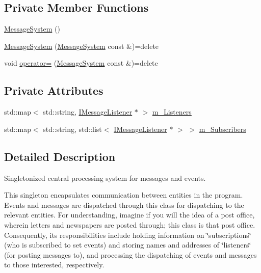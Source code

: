 \subsection*{Private Member Functions}
\begin{DoxyCompactItemize}
\item 
\hyperlink{class_message_system_ac7a164731432f7aa8bfadbc46008f777}{Message\+System} ()
\item 
\hyperlink{class_message_system_ab0bcc49967b11c9e34231972b44a22cd}{Message\+System} (\hyperlink{class_message_system}{Message\+System} const \&)=delete
\item 
void \hyperlink{class_message_system_adae1512cf046f08efff4b00244d80caf}{operator=} (\hyperlink{class_message_system}{Message\+System} const \&)=delete
\end{DoxyCompactItemize}
\subsection*{Private Attributes}
\begin{DoxyCompactItemize}
\item 
std\+::map$<$ std\+::string, \hyperlink{class_i_message_listener}{I\+Message\+Listener} $\ast$ $>$ \hyperlink{class_message_system_ab4b90cfd3e6e27a6ae7417ecf17123d7}{m\+\_\+\+Listeners}
\item 
std\+::map$<$ std\+::string, std\+::list$<$ \hyperlink{class_i_message_listener}{I\+Message\+Listener} $\ast$ $>$ $>$ \hyperlink{class_message_system_a64730035cb0e435bd3b1ff4c1c8dfe20}{m\+\_\+\+Subscribers}
\end{DoxyCompactItemize}


\subsection{Detailed Description}
Singletonized central processing system for messages and events. 

This singleton encapsulates communication between entities in the program. Events and messages are dispatched through this class for dispatching to the relevant entities. For understanding, imagine if you will the idea of a post office, wherein letters and newspapers are posted through; this class is that post office. Consequently, its responsibilities include holding information on \char`\"{}subscriptions\char`\"{} (who is subscribed to set events) and storing names and addresses of \char`\"{}listeners\char`\"{} (for posting messages to), and processing the dispatching of events and messages to those interested, respectively.

